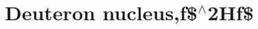 \hypertarget{group___deuteron}{}\section{Deuteron nucleus,f\$$^\wedge$2\+Hf\$}
\label{group___deuteron}
